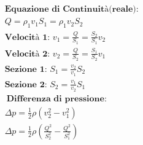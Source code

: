 \begin{gather*}
    \textbf{Equazione di Continuità(reale): } \\ Q = \rho_1 v_1 S_1 = \rho_1 v_2 S_2 \\
    \textbf{Velocità 1: } v_1 = \frac{Q}{S_1} = \frac{S_2}{S_1} v_2 \\
    \textbf{Velocità 2: } v_2 = \frac{Q}{S_2} = \frac{S_1}{S_2} v_1 \\
    \textbf{Sezione 1: } S_1 = \frac{v_2}{v_1} S_2 \\
    \textbf{Sezione 2: } S_2 = \frac{v_1}{v_2} S_1 \\\
    \textbf{Differenza di pressione: } \\
    \Delta p = \frac{1}{2} \rho (v_2^2 - v_1^2) \\
    \Delta p = \frac{1}{2} \rho (\frac{Q^2}{S_2^2} - \frac{Q^2}{S_1^2})
\end{gather*}